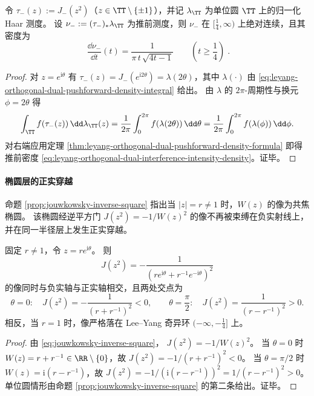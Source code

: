 \begin{corollary}[虚轴对偶门的干涉强度律]\label{cor:leyang-orthogonal-dual-interference-intensity-density}
令 \(\tau_{-}(z):=J_{-}(z^2)\)（\(z\in\TT\setminus\{\pm 1\}\)），并记 \(\lambda_{\TT}\) 为单位圆 \(\TT\) 上的归一化 Haar 测度。
设 \(\nu_{-}:=(\tau_{-})_{\ast}\lambda_{\TT}\) 为推前测度，则 \(\nu_{-}\) 在 \([\tfrac14,\infty)\) 上绝对连续，且其密度为
\begin{equation}\label{eq:leyang-orthogonal-dual-interference-intensity-density}
\boxed{\;
\frac{\dd\nu_{-}}{\dd t}(t)=\frac{1}{\pi\,t\,\sqrt{4t-1}}\qquad\left(t\ge \frac14\right)\; }.
\end{equation}
\end{corollary}
\begin{proof}
对 \(z=e^{\mathrm{i}\theta}\) 有 \(\tau_{-}(z)=J_{-}(e^{\mathrm{i}2\theta})=\lambda(2\theta)\)，其中 \(\lambda(\cdot)\) 由 \eqref{eq:leyang-orthogonal-dual-pushforward-density-integral} 给出。
由 \(\lambda\) 的 \(2\pi\)-周期性与换元 \(\phi=2\theta\) 得
\[
\int_{\TT} f(\tau_{-}(z))\,\dd\lambda_{\TT}(z)
=\frac{1}{2\pi}\int_{0}^{2\pi} f(\lambda(2\theta))\,\dd\theta
=\frac{1}{2\pi}\int_{0}^{2\pi} f(\lambda(\phi))\,\dd\phi.
\]
对右端应用定理 \ref{thm:leyang-orthogonal-dual-pushforward-density-formula} 即得推前密度 \eqref{eq:leyang-orthogonal-dual-interference-intensity-density}。证毕。
\end{proof}

\paragraph{椭圆层的正实穿越}
命题 \ref{prop:jouwkowsky-inverse-square} 指出当 \(|z|=r\neq 1\) 时，\(W(z)\) 的像为共焦椭圆。
该椭圆经逆平方门 \(J(z^2)=-1/W(z)^2\) 的像不再被束缚在负实射线上，并在同一半径层上发生正实穿越。

\begin{proposition}[离开单位圆的正实穿越判别]\label{prop:leyang-ellipse-layer-positive-real-crossing}
固定 \(r\neq 1\)，令 \(z=re^{\mathrm{i}\theta}\)。
则
\[
J(z^2)=-\frac{1}{(re^{\mathrm{i}\theta}+r^{-1}e^{-\mathrm{i}\theta})^2}
\]
的像同时与负实轴与正实轴相交，且两处交点为
\[
\theta=0:\quad J(z^2)=-\frac{1}{(r+r^{-1})^2}<0,\qquad
\theta=\frac{\pi}{2}:\quad J(z^2)=\frac{1}{(r-r^{-1})^2}>0.
\]
相反，当 \(r=1\) 时，像严格落在 Lee--Yang 奇异环 \((-\infty,-\tfrac14]\) 上。
\end{proposition}
\begin{proof}
由 \eqref{eq:jouwkowsky-inverse-square}，
\(
J(z^2)=-1/W(z)^2
\)。
当 \(\theta=0\) 时 \(W(z)=r+r^{-1}\in\RR\setminus\{0\}\)，故 \(J(z^2)=-1/(r+r^{-1})^2<0\)。
当 \(\theta=\pi/2\) 时 \(W(z)=\mathrm{i}(r-r^{-1})\)，故 \(J(z^2)=-1/(\mathrm{i}(r-r^{-1}))^2=1/(r-r^{-1})^2>0\)。
单位圆情形由命题 \ref{prop:jouwkowsky-inverse-square} 的第二条给出。证毕。
\end{proof}

